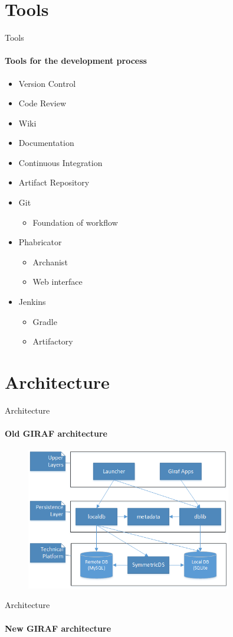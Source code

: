 \section{Tools}
    \begin{frame}[t]{Tools}\framesubtitle{Tools for the development process}
        \begin{itemize}<1-2>
        	\item Version Control
        	\item Code Review
        	\item Wiki
        	\item Documentation
        	\item Continuous Integration
        	\item Artifact Repository
        \end{itemize}

        \begin{itemize}<2->
            \item Git
        	\begin{itemize}
        		\item Foundation of workflow
        	\end{itemize}
        	\item Phabricator
        	\begin{itemize}
        		\item Archanist
        		\item Web interface
        	\end{itemize}
        	\item Jenkins
        	\begin{itemize}
        		\item Gradle
        		\item Artifactory
        	\end{itemize}
        \end{itemize}
    \end{frame}
\section{Architecture}
    \begin{frame}[t]{Architecture}\framesubtitle{Old GIRAF architecture}
        \begin{figure}
        	\includegraphics[width=0.8\textwidth]{images/old_architecture.png}
        \end{figure}
    \end{frame}

    \begin{frame}[t]{Architecture}\framesubtitle{New GIRAF architecture}
    	\begin{figure}
    		\scalebox{0.6}{%
        	}
        \end{figure}
    \end{frame}
